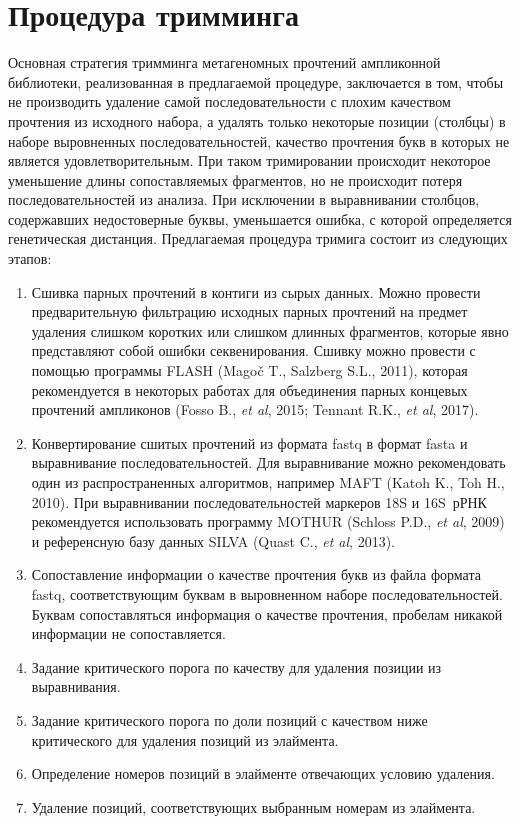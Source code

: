 \documentclass[a4paper,12pt,openany,final]{extreport}
\begin{document}
\section{Процедура тримминга}
Основная стратегия тримминга метагеномных прочтений ампликонной библиотеки, реализованная в предлагаемой процедуре, заключается в том, чтобы не производить удаление самой последовательности с плохим качеством прочтения из исходного набора, а удалять только некоторые позиции (столбцы) в наборе выровненных последовательностей, качество прочтения букв в которых не является удовлетворительным. При таком тримировании происходит некоторое уменьшение длины сопоставляемых фрагментов, но не происходит потеря последовательностей из анализа. При исключении в выравнивании столбцов, содержавших недостоверные буквы, уменьшается ошибка, с которой определяется генетическая дистанция.  Предлагаемая процедура тримига состоит из следующих этапов:

\begin{enumerate}
\item Сшивка парных прочтений в контиги из сырых данных. Можно провести предварительную фильтрацию исходных парных прочтений на предмет удаления слишком коротких или слишком длинных фрагментов, которые явно представляют собой ошибки секвенирования. Сшивку можно провести с помощью программы FLASH (Magoč T., Salzberg S.L., 2011), которая рекомендуется в некоторых работах для объединения парных концевых прочтений ампликонов (Fosso B., \textit{et al}, 2015; Tennant R.K., \textit{et al}, 2017).

\item Конвертирование сшитых прочтений из формата fastq в формат fasta и выравнивание последовательностей. Для выравнивание можно рекомендовать один из распространенных алгоритмов, например MAFT (Katoh K., Toh H., 2010). При выравнивании последовательностей маркеров 18S и 16S~рРНК рекомендуется использовать программу MOTHUR (Schloss P.D., \textit{et al}, 2009) и референсную базу данных SILVA (Quast C., \textit{et al}, 2013).

\item Сопоставление информации о качестве прочтения букв из файла формата fastq, соответствующим буквам в выровненном наборе последовательностей.  Буквам сопоставляться информация о качестве прочтения, пробелам никакой информации не сопоставляется.

\item Задание критического порога по качеству для удаления позиции из выравнивания.

\item Задание критического порога по доли позиций с качеством ниже критического для удаления позиций из элаймента.

\item Определение номеров позиций в элайменте отвечающих условию удаления.

\item Удаление позиций, соответствующих выбранным номерам из элаймента.
\end{enumerate}
\end{document}
